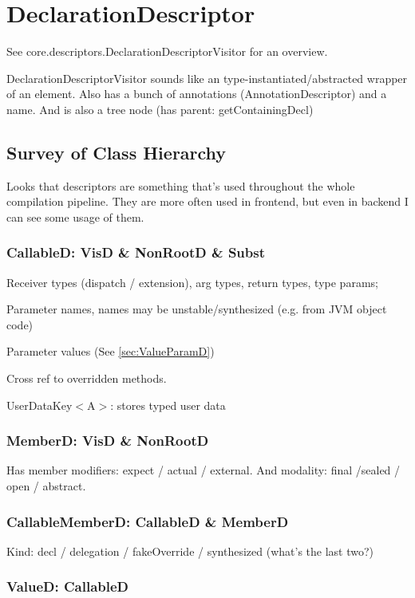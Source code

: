 \documentclass{article}
\begin{document}
\section{DeclarationDescriptor}
\label{sec:descriptor}

See core.descriptors.DeclarationDescriptorVisitor for an overview.

DeclarationDescriptorVisitor sounds like an type-instantiated/abstracted wrapper of an element. Also has a bunch of annotations (AnnotationDescriptor) and a name. And is also a tree node (has parent: getContainingDecl)

\subsection{Survey of Class Hierarchy}

Looks that descriptors are something that's used throughout the whole compilation pipeline. They are more often used in frontend, but even in backend I can see some usage of them.

\subsubsection{CallableD: VisD \& NonRootD \& Subst}

Receiver types (dispatch / extension), arg types, return types, type params;

Parameter names, names may be unstable/synthesized (e.g. from JVM object code)

Parameter values (See \ref{sec:ValueParamD})

Cross ref to overridden methods.

UserDataKey$<$A$>$: stores typed user data

\subsubsection{MemberD: VisD \& NonRootD}

Has member modifiers: expect / actual / external. And modality: final /sealed / open / abstract.

\subsubsection{CallableMemberD: CallableD \& MemberD}

Kind: decl / delegation / fakeOverride / synthesized (what's the last two?)

\subsubsection{ValueD: CallableD}
\end{document}
